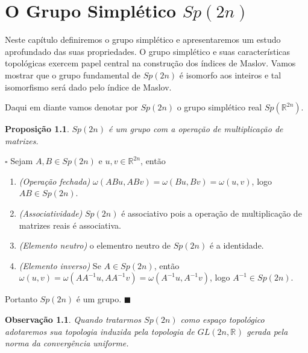 \documentclass[12pt]{book}
\newtheorem{observacao}[teorema]{Observação}
\newtheorem{proposicao}[teorema]{Proposição}
\newenvironment{prova}[1]{$\square$ #1}{\hfill$\blacksquare$}
\newcommand{\generalgroup}[2]{GL(#1, #2)}
\newcommand{\generalgroupreal}[1]{\generalgroup{#1}{\real{}}}
\newcommand{\gruposimpletico}[1]{Sp(#1)}
\newcommand{\real}[1]{\mathbb{R}^{#1}}
\begin{document}
	\chapter{O Grupo Simplético $\gruposimpletico{2n}$}\label{capitulo_grupo_simpletico}
	Neste capítulo definiremos o grupo simplético e apresentaremos um estudo aprofundado das suas propriedades. O grupo simplético e suas características topológicas exercem papel central na construção dos índices de Maslov. Vamos mostrar que o grupo fundamental de $Sp(2n)$ é isomorfo aos inteiros e tal isomorfismo será dado pelo índice de Maslov.
	
	Daqui em diante vamos denotar por $\gruposimpletico{2n}$ o grupo simplético real $\gruposimpletico{\real{2n}}$.
	
	\begin{proposicao}\label{proposicao_grupo_simpletico_estrutura_grupo}
		$\gruposimpletico{2n}$ é um grupo com a operação de multiplicação de matrizes.
	\end{proposicao}
	\begin{prova}
		Sejam $A,B \in \gruposimpletico{2n}$ e $u,v \in \real{2n}$, então
		\begin{enumerate}
			\item \textit{(Operação fechada)} $\omega(ABu, ABv) = \omega(Bu, Bv) = \omega(u,v)$, logo $AB \in \gruposimpletico{2n}$.
			
			\item \textit{(Associatividade)} $\gruposimpletico{2n}$ é associativo pois a operação de multiplicação de matrizes reais é associativa.
			
			\item \textit{(Elemento neutro)} o elementro neutro de $\gruposimpletico{2n}$ é a identidade.
			
			\item \textit{(Elemento inverso)} Se $A \in \gruposimpletico{2n}$, então $\omega(u, v)=\omega(AA^{-1}u, AA^{-1}v) = \omega(A^{-1}u, A^{-1}v)$, logo $A^{-1} \in \gruposimpletico{2n}$. 
		\end{enumerate}
		Portanto $\gruposimpletico{2n}$ é um grupo.
	\end{prova}
	
	\begin{observacao}
		Quando tratarmos $\gruposimpletico{2n}$ como espaço topológico adotaremos sua topologia induzida pela topologia de $\generalgroupreal{2n}$ gerada pela norma da convergência uniforme.
	\end{observacao}
	
\end{document}
